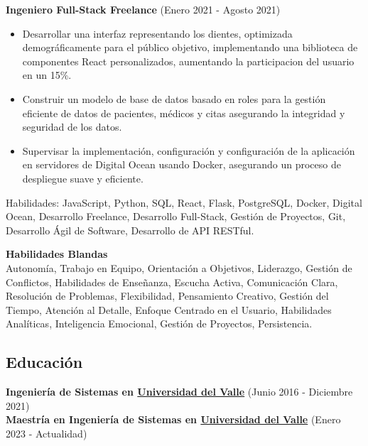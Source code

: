 \documentclass[letterpaper,10pt]{article}
\begin{document}
  \vspace*{0.2cm}
  \textbf{Ingeniero Full-Stack Freelance} (Enero 2021 - Agosto 2021)
  \hfill
  \vspace*{0.2cm}
  \begin{minipage}{\linewidth}
    \begin{itemize}[noitemsep]
      \item Desarrollar una interfaz representando los dientes, optimizada demográficamente para el público objetivo, implementando una biblioteca de componentes React personalizados, aumentando la participacion del usuario en un 15\%.
      \item Construir un modelo de base de datos basado en roles para la gestión eficiente de datos de pacientes, médicos y citas asegurando la integridad y seguridad de los datos.
      \item Supervisar la implementación, configuración y configuración de la aplicación en servidores de Digital Ocean usando Docker, asegurando un proceso de despliegue suave y eficiente.
    \end{itemize}
    \hfill
  \end{minipage}
  Habilidades: JavaScript, Python, SQL, React, Flask, PostgreSQL, Docker, Digital Ocean, Desarrollo Freelance, Desarrollo Full-Stack, Gestión de Proyectos, Git, Desarrollo Ágil de Software, Desarrollo de API RESTful.
  
  \newpage
  \vspace*{0.2cm}
  \textbf{Habilidades Blandas}\\
  Autonomía, Trabajo en Equipo, Orientación a Objetivos, Liderazgo, Gestión de Conflictos, Habilidades de Enseñanza, Escucha Activa, Comunicación Clara, Resolución de Problemas, Flexibilidad, Pensamiento Creativo, Gestión del Tiempo, Atención al Detalle, Enfoque Centrado en el Usuario, Habilidades Analíticas, Inteligencia Emocional, Gestión de Proyectos, Persistencia.
  
  \subsection*{Educación}
  \vspace*{0.2cm}
  \textbf{Ingeniería de Sistemas en \href{https://www.univalle.edu.co/}{Universidad del Valle}} \hfill (Junio 2016 - Diciembre 2021)\\
  \textbf{Maestría en Ingeniería de Sistemas en \href{https://www.univalle.edu.co/}{Universidad del Valle}} \hfill (Enero 2023 - Actualidad)
\end{document}
